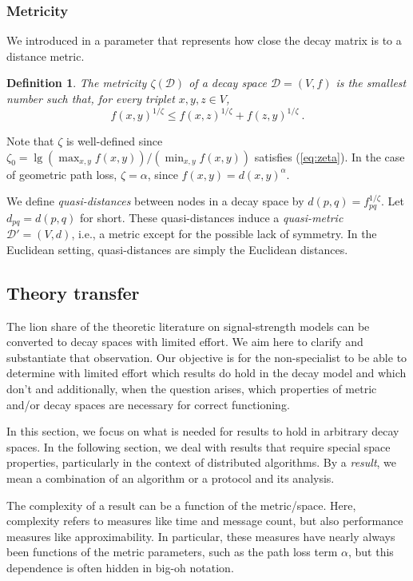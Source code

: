 \documentclass[11pt]{amsart}
\newtheorem{definition}{Definition}[section]
\def\calD{{\mathcal{D}}}
\begin{document}
\subsubsection*{Metricity}
We introduced in \cite{us:ICDCS14} a parameter that represents how close the decay matrix is to a distance metric. 
\begin{definition}
The \emph{metricity} $\zeta(\calD)$ of a decay space $\calD = (V,f)$ is
the smallest number such that, for every triplet $x,y,z \in V$,
  \begin{equation}
     f(x,y)^{1/\zeta} \le f(x,z)^{1/\zeta} + f(z,y)^{1/\zeta}\ .
  \label{eq:zeta}
  \end{equation}
\end{definition}
Note that $\zeta$ is well-defined since $\zeta_0 = \lg (\max_{x,y}
f(x,y))/(\min_{x,y} f(x,y))$ satisfies (\ref{eq:zeta}).
In the case of geometric path loss, $\zeta = \alpha$, since
$f(x,y) = d(x,y)^\alpha$. 

We define \emph{quasi-distances} between nodes in a decay space 
by $d(p,q) = f_{pq}^{1/\zeta}$. Let $d_{pq}=d(p,q)$ for short.
These quasi-distances induce a \emph{quasi-metric} 
$\calD' = (V,d)$, i.e., a metric except for the possible lack of symmetry.
In the Euclidean setting, quasi-distances are simply the Euclidean distances.



\subsection{Theory transfer}
\label{sec:theorytransfer}

The lion share of the theoretic literature on signal-strength models
can be converted to decay spaces with limited effort.
We aim here to clarify and substantiate that observation.
Our objective is for the non-specialist to be able to determine with
limited effort which results do hold in the decay model and which don't and additionally, when the question arises, which properties of metric
and/or decay spaces are necessary for correct functioning.

In this section, we focus on what is needed for results to hold in
arbitrary decay spaces. In the following section, we deal with results that require special space properties, particularly in the context of distributed algorithms.
By a \emph{result}, we mean a combination of an algorithm or a protocol and its
analysis.

The complexity of a result can be a function of the metric/space.
Here, complexity refers to measures like time and message count, 
but also performance
measures like approximability. In particular, these measures have
nearly always been functions of the metric parameters, such as the
path loss term $\alpha$, but this dependence is often hidden in big-oh notation.
\end{document}
